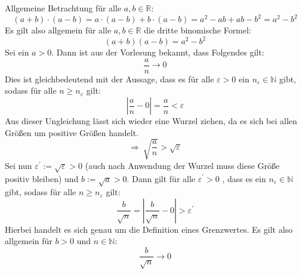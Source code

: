 \documentclass[10pt, a4paper]{article}
\begin{document}
		Allgemeine Betrachtung für alle $a,b \in \mathbb{R}$:
		\[
			(a+b)\cdot(a-b) = a\cdot(a-b) + b\cdot(a-b) = a^2 - ab + ab -b^2 = a^2 -b^2
		\]
		Es gilt also allgemein für alle $a,b \in \mathbb{R}$ die dritte binomische Formel:
		\[
			(a+b)(a-b) = a^2-b^2
		\]
		Sei ein $a > 0$. Dann ist aus der Vorlesung bekannt, dass Folgendes gilt:
		\[
			\dfrac{a}{n}\longrightarrow 0
		\]
		Dies ist gleichbedeutend mit der Aussage, dass es für alle $\varepsilon > 0$ ein $n_{\varepsilon}\in \mathbb{N}$ gibt, sodass für alle $n \geq n_{\varepsilon}$ gilt:
		\[
			\left| \dfrac{a}{n} - 0 \right| = \dfrac{a}{n} < \varepsilon
		\]
		Aus dieser Ungleichung lässt sich wieder eine Wurzel ziehen, da es sich bei allen Größen um positive Größen handelt.
		\[
			\Rightarrow \ \sqrt{\dfrac{a}{n}} > \sqrt{\varepsilon} 
		\]
		Sei nun $\varepsilon^\prime := \sqrt{\varepsilon} > 0$ (auch nach Anwendung der Wurzel muss diese Größe positiv bleiben) und $b:=\sqrt{a}>0$. Dann gilt für alle $\varepsilon^\prime > 0$ , dass es ein $n_{\varepsilon}\in \mathbb{N}$ gibt, sodass für alle $n \geq n_{\varepsilon}$ gilt:
		\[
			\dfrac{b}{\sqrt{n}} = \left| \dfrac{b}{\sqrt{n}} -0 \right| > \varepsilon^\prime
		\]
		Hierbei handelt es sich genau um die Definition eines Grenzwertes. Es gilt also allgemein für $b > 0$ und $n \in \mathbb{N}$:
		\[
			\dfrac{b}{\sqrt{n}} \longrightarrow 0
		\]
\end{document}
